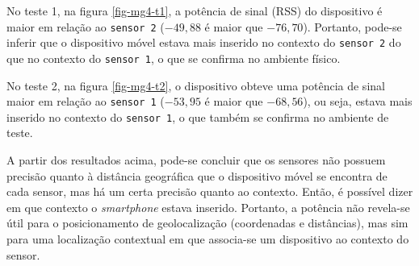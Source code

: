 No teste 1, na figura \autoref{fig-mg4-t1}, a potência de sinal (RSS) do dispositivo é maior em relação ao
\texttt{sensor 2} ($-49,88$ é maior que $-76,70$). Portanto, pode-se inferir que o
dispositivo móvel estava mais inserido no contexto do \texttt{sensor 2} do que no contexto
do \texttt{sensor 1}, o que se confirma no ambiente físico.

No teste 2, na figura \autoref{fig-mg4-t2}, o dispositivo obteve uma potência de sinal maior em relação ao
\texttt{sensor 1} ($-53,95$ é maior que $-68,56$), ou seja, estava mais inserido no contexto
do \texttt{sensor 1}, o que também se confirma no ambiente de teste.

A partir dos resultados acima, pode-se concluir que os sensores não possuem
precisão quanto à distância geográfica que o dispositivo móvel se encontra de
cada sensor, mas há um certa precisão quanto ao contexto. Então, é possível
dizer em que contexto o \emph{smartphone} estava inserido. Portanto,
a potência não revela-se útil para o posicionamento de geolocalização
(coordenadas e distâncias), mas sim para uma localização
contextual em que associa-se um dispositivo ao contexto do sensor.


